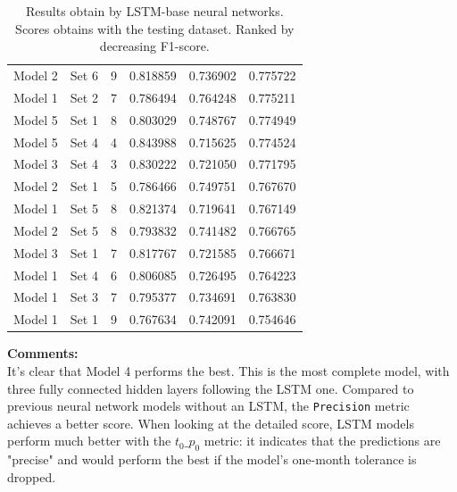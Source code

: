 \begin{table}[htbp]
\begin{tabular}{c|c|c|c|c|c}
        Model 2    &	Set 6	    &   9      &      0.818859     &	0.736902    &	0.775722  \\
        Model 1    &	Set 2	    &   7      &      0.786494     &	0.764248    &	0.775211  \\
        Model 5    &	Set 1	    &   8      &      0.803029     &	0.748767    &	0.774949  \\
        Model 5    &	Set 4	    &   4      &      0.843988     &	0.715625    &	0.774524  \\
        Model 3    &	Set 4	    &   3      &      0.830222     &	0.721050    &	0.771795  \\
        Model 2    &	Set 1	    &   5      &      0.786466     &	0.749751    &	0.767670  \\
        Model 1    &	Set 5	    &   8      &      0.821374     &	0.719641    &	0.767149  \\
        Model 2    &	Set 5	    &   8      &      0.793832     &	0.741482    &	0.766765  \\
        Model 3    &	Set 1	    &   7      &      0.817767     &	0.721585    &	0.766671  \\
        Model 1    &	Set 4	    &   6      &      0.806085     &	0.726495    &	0.764223  \\
        Model 1    &	Set 3	    &   7      &      0.795377     &	0.734691    &	0.763830  \\
        Model 1    &	Set 1	    &   9      &      0.767634     &	0.742091    &	0.754646  \\
    \end{tabular}
    \caption[LSTM models results]{Results obtain by LSTM-base neural networks. Scores obtains with the testing dataset. Ranked by decreasing F1-score.}
    \label{tab-annex:nn-experiments-lstm}
\end{table}


\noindent\textbf{Comments:}\\
It's clear that Model 4 performs the best. This is the most complete model, with three fully connected hidden layers following the LSTM one. Compared to previous neural network models without an LSTM, the \texttt{Precision} metric achieves a better score. When looking at the detailed score, LSTM models perform much better with the $t_0\_p_0$ metric: it indicates that the predictions are "precise" and would perform the best if the model's one-month tolerance is dropped.